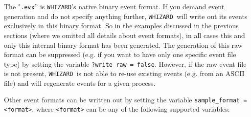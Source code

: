 \documentclass[12pt]{book}
\newcommand{\ttt}[1]{\texttt{#1}}
\newcommand{\whizard}{\texttt{WHIZARD}}
\begin{document}
The "\ttt{.evx}'' is \whizard's native binary event format. If you
demand event generation and do not specify anything further, \whizard\
will write out its events exclusively in this binary format. So in the
examples discussed in the previous sections (where we omitted all
details about event formats), in all cases this and only this internal
binary format has been generated. The generation of this raw format
can be suppressed (e.g. if you want to have only one specific event
file type) by setting the variable \verb|?write_raw = false|. However, 
if the raw event file is not present, \whizard\ is not able to re-use
existing events (e.g. from an ASCII file) and will regenerate events
for a given process. 

Other event formats can be written out by setting the variable
\ttt{sample\_format = <format>}, where \ttt{<format>} can be any of
the following supported variables: 
\end{document}
